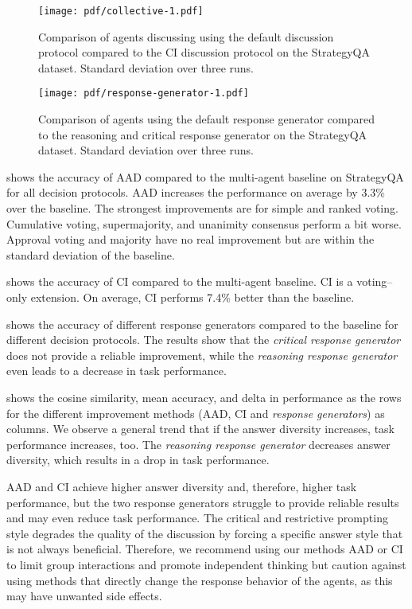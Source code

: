 \begin{figure}[t]
    \centering
    \texttt{[image: pdf/collective-1.pdf]}
    \caption{Comparison of agents discussing using the default discussion protocol compared to the \ac{CI} discussion protocol on the StrategyQA dataset. Standard deviation over three runs.
    \vspace{-0.5cm}}
    \label{fig:collective}
\end{figure}

\begin{figure}[t]
    \centering
    \texttt{[image: pdf/response-generator-1.pdf]}
    \caption{Comparison of agents using the default response generator compared to the reasoning and critical response generator on the StrategyQA dataset. Standard deviation over three runs.}
    \label{fig:response_generator}
\end{figure}
 shows the accuracy of \ac{AAD} compared to the multi-agent baseline on StrategyQA for all decision protocols. 
\ac{AAD} increases the performance on average by $3.3\%$ over the baseline. 
The strongest improvements are for simple and ranked voting.
Cumulative voting, supermajority, and unanimity consensus perform a bit worse.
Approval voting and majority have no real improvement but are within the standard deviation of the baseline.

 shows the accuracy of \ac{CI} compared to the multi-agent baseline. 
\ac{CI} is a voting--only extension. 
On average, \ac{CI} performs 7.4\% better than the baseline.

 shows the accuracy of different response generators compared to the baseline for different decision protocols. 
The results show that the \textit{critical response generator} does not provide a reliable improvement, while the \textit{reasoning response generator} even leads to a decrease in task performance.

 shows the cosine similarity, mean accuracy, and delta in performance as the rows for the different improvement methods (\ac{AAD}, \ac{CI} and \textit{response generators}) as columns.
We observe a general trend that if the answer diversity increases, task performance increases, too. The \textit{reasoning response generator} decreases answer diversity, which results in a drop in task performance.


\ac{AAD} and \ac{CI} achieve higher answer diversity and, therefore, higher task performance, but the two response generators struggle to provide reliable results and may even reduce task performance. 
The critical and restrictive prompting style degrades the quality of the discussion by forcing a specific answer style that is not always beneficial.
Therefore, we recommend using our methods \ac{AAD} or \ac{CI} to limit group interactions and promote independent thinking but caution against using methods that directly change the response behavior of the agents, as this may have unwanted side effects.










